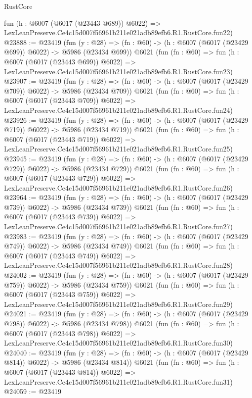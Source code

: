 \begin{lexlean}{RustCore}
\begin{coremodule}
    fun (h : @6007 (@6017 (@23443 @689)) @6022) =>
    LexLeanPreserve.Ce4c15d007f56961b211e021adb89efb6.R1.RustCore.fun22)
@23888 := @23419
    (fun (y : @28) => (fn : @60) -> (h : @6007 (@6017 (@23429 @699)) @6022) -> @5986 (@23434 @699))
    @6021
    (fun (fn : @60) =>
    fun (h : @6007 (@6017 (@23443 @699)) @6022) =>
    LexLeanPreserve.Ce4c15d007f56961b211e021adb89efb6.R1.RustCore.fun23)
@23907 := @23419
    (fun (y : @28) => (fn : @60) -> (h : @6007 (@6017 (@23429 @709)) @6022) -> @5986 (@23434 @709))
    @6021
    (fun (fn : @60) =>
    fun (h : @6007 (@6017 (@23443 @709)) @6022) =>
    LexLeanPreserve.Ce4c15d007f56961b211e021adb89efb6.R1.RustCore.fun24)
@23926 := @23419
    (fun (y : @28) => (fn : @60) -> (h : @6007 (@6017 (@23429 @719)) @6022) -> @5986 (@23434 @719))
    @6021
    (fun (fn : @60) =>
    fun (h : @6007 (@6017 (@23443 @719)) @6022) =>
    LexLeanPreserve.Ce4c15d007f56961b211e021adb89efb6.R1.RustCore.fun25)
@23945 := @23419
    (fun (y : @28) => (fn : @60) -> (h : @6007 (@6017 (@23429 @729)) @6022) -> @5986 (@23434 @729))
    @6021
    (fun (fn : @60) =>
    fun (h : @6007 (@6017 (@23443 @729)) @6022) =>
    LexLeanPreserve.Ce4c15d007f56961b211e021adb89efb6.R1.RustCore.fun26)
@23964 := @23419
    (fun (y : @28) => (fn : @60) -> (h : @6007 (@6017 (@23429 @739)) @6022) -> @5986 (@23434 @739))
    @6021
    (fun (fn : @60) =>
    fun (h : @6007 (@6017 (@23443 @739)) @6022) =>
    LexLeanPreserve.Ce4c15d007f56961b211e021adb89efb6.R1.RustCore.fun27)
@23983 := @23419
    (fun (y : @28) => (fn : @60) -> (h : @6007 (@6017 (@23429 @749)) @6022) -> @5986 (@23434 @749))
    @6021
    (fun (fn : @60) =>
    fun (h : @6007 (@6017 (@23443 @749)) @6022) =>
    LexLeanPreserve.Ce4c15d007f56961b211e021adb89efb6.R1.RustCore.fun28)
@24002 := @23419
    (fun (y : @28) => (fn : @60) -> (h : @6007 (@6017 (@23429 @759)) @6022) -> @5986 (@23434 @759))
    @6021
    (fun (fn : @60) =>
    fun (h : @6007 (@6017 (@23443 @759)) @6022) =>
    LexLeanPreserve.Ce4c15d007f56961b211e021adb89efb6.R1.RustCore.fun29)
@24021 := @23419
    (fun (y : @28) => (fn : @60) -> (h : @6007 (@6017 (@23429 @798)) @6022) -> @5986 (@23434 @798))
    @6021
    (fun (fn : @60) =>
    fun (h : @6007 (@6017 (@23443 @798)) @6022) =>
    LexLeanPreserve.Ce4c15d007f56961b211e021adb89efb6.R1.RustCore.fun30)
@24040 := @23419
    (fun (y : @28) => (fn : @60) -> (h : @6007 (@6017 (@23429 @814)) @6022) -> @5986 (@23434 @814))
    @6021
    (fun (fn : @60) =>
    fun (h : @6007 (@6017 (@23443 @814)) @6022) =>
    LexLeanPreserve.Ce4c15d007f56961b211e021adb89efb6.R1.RustCore.fun31)
@24059 := @23419

\end{coremodule}
\end{lexlean}
